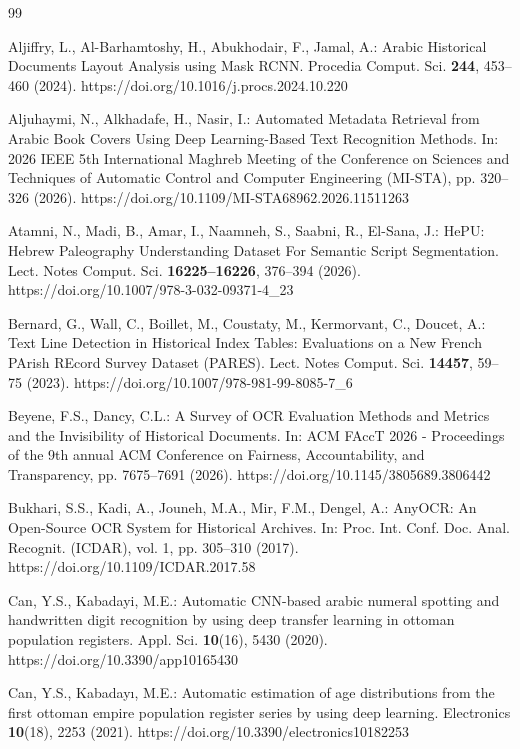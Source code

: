 \documentclass[pdflatex,sn-mathphys-num]{sn-jnl}
\begin{document}
\begin{thebibliography}{99}

Aljiffry, L., Al-Barhamtoshy, H., Abukhodair, F., Jamal, A.: Arabic Historical Documents Layout Analysis using Mask RCNN. Procedia Comput. Sci. \textbf{244}, 453--460 (2024). https://doi.org/10.1016/j.procs.2024.10.220

Aljuhaymi, N., Alkhadafe, H., Nasir, I.: Automated Metadata Retrieval from Arabic Book Covers Using Deep Learning-Based Text Recognition Methods. In: 2026 IEEE 5th International Maghreb Meeting of the Conference on Sciences and Techniques of Automatic Control and Computer Engineering (MI-STA), pp. 320--326 (2026). https://doi.org/10.1109/MI-STA68962.2026.11511263

Atamni, N., Madi, B., Amar, I., Naamneh, S., Saabni, R., El-Sana, J.: HePU: Hebrew Paleography Understanding Dataset For Semantic Script Segmentation. Lect. Notes Comput. Sci. \textbf{16225--16226}, 376--394 (2026). https://doi.org/10.1007/978-3-032-09371-4\_23

Bernard, G., Wall, C., Boillet, M., Coustaty, M., Kermorvant, C., Doucet, A.: Text Line Detection in Historical Index Tables: Evaluations on a New French PArish REcord Survey Dataset (PARES). Lect. Notes Comput. Sci. \textbf{14457}, 59--75 (2023). https://doi.org/10.1007/978-981-99-8085-7\_6

Beyene, F.S., Dancy, C.L.: A Survey of OCR Evaluation Methods and Metrics and the Invisibility of Historical Documents. In: ACM FAccT 2026 - Proceedings of the 9th annual ACM Conference on Fairness, Accountability, and Transparency, pp. 7675--7691 (2026). https://doi.org/10.1145/3805689.3806442

Bukhari, S.S., Kadi, A., Jouneh, M.A., Mir, F.M., Dengel, A.: AnyOCR: An Open-Source OCR System for Historical Archives. In: Proc. Int. Conf. Doc. Anal. Recognit. (ICDAR), vol. 1, pp. 305--310 (2017). https://doi.org/10.1109/ICDAR.2017.58

Can, Y.S., Kabadayi, M.E.: Automatic CNN-based arabic numeral spotting and handwritten digit recognition by using deep transfer learning in ottoman population registers. Appl. Sci. \textbf{10}(16), 5430 (2020). https://doi.org/10.3390/app10165430

Can, Y.S., Kabadayı, M.E.: Automatic estimation of age distributions from the first ottoman empire population register series by using deep learning. Electronics \textbf{10}(18), 2253 (2021). https://doi.org/10.3390/electronics10182253


\end{thebibliography}
\end{document}
